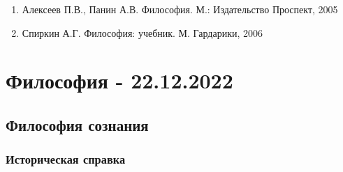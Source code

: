\documentclass{article}
\begin{document}
\begin{enumerate}
    \item Алексеев П.В., Панин А.В. Философия. М.: Издательство Проспект, 2005
    \item Спиркин А.Г. Философия: учебник. М. Гардарики, 2006
\end{enumerate}

\pagebreak
\section{Философия - 22.12.2022}

\subsection{Философия сознания}

\subsubsection{Историческая справка}
\end{document}
